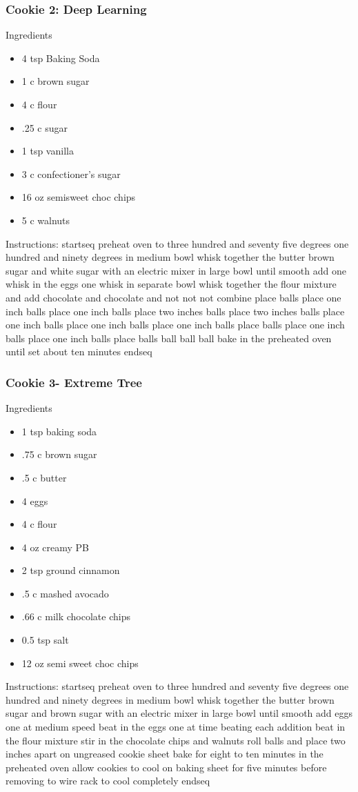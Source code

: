 \documentclass[11pt, a4paper]{article}
\begin{document}
	\subsubsection*{Cookie 2: Deep Learning}
	Ingredients
		\begin{multicols}{2}			\begin{itemize}
				\item 4 tsp Baking Soda
				\item1 c brown sugar
				\item 4 c flour
				\item .25 c sugar
				\item 	1 tsp vanilla
				\item 3 c confectioner’s sugar
				\item 16 oz semisweet choc chips
				\item 5 c walnuts
			\end{itemize}
		\end{multicols}
	Instructions: startseq preheat oven to three hundred and seventy five degrees one hundred and ninety degrees in medium bowl whisk together the butter brown sugar and white sugar with an electric mixer in large bowl until smooth add one whisk in the eggs one whisk in separate bowl whisk together the flour mixture and add chocolate and chocolate and not not not combine place balls place one inch balls place one inch balls place two inches balls place two inches balls place one inch balls place one inch balls place one inch balls place balls place one inch balls place one inch balls place balls ball ball ball bake in the preheated oven until set about ten minutes endseq
   \subsubsection*{Cookie 3- Extreme Tree}
   Ingredients
   \begin{multicols}{2}
		\begin{itemize}
		\item1 tsp baking soda
		\item.75 c brown sugar
		\item.5 c butter
		\item4 eggs
		\item4 c flour
		\item4 oz creamy PB
		\item2 tsp ground cinnamon
		\item.5 c mashed avocado
		\item.66 c milk chocolate chips
		\item0.5 tsp salt
		\item12 oz semi sweet choc chips
	\end{itemize}
	\end{multicols}
Instructions: startseq preheat oven to three hundred and seventy five degrees one hundred and ninety degrees in medium bowl whisk together the butter brown sugar and brown sugar with an electric mixer in large bowl until smooth add eggs one at medium speed beat in the eggs one at time beating each addition beat in the flour mixture stir in the chocolate chips and walnuts roll balls and place two inches apart on ungreased cookie sheet bake for eight to ten minutes in the preheated oven allow cookies to cool on baking sheet for five minutes before removing to wire rack to cool completely endseq
\end{document}
